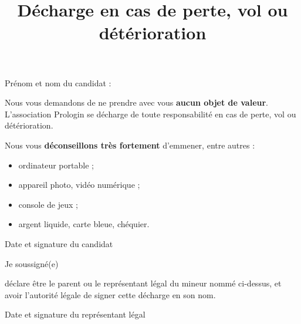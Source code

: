 \documentclass[a4paper,11pt]{prologin}
\title{Décharge en cas de perte, vol ou détérioration}
\begin{document}
Prénom et nom du candidat : \hrulefill

Nous vous demandons de ne prendre avec vous \textbf{aucun objet de valeur}.
L'association Prologin se décharge de toute responsabilité en cas de perte,
vol ou détérioration.

Nous vous \textbf{déconseillons très fortement} d'emmener, entre autres :
\begin{itemize}
\item ordinateur portable ;
\item appareil photo, vidéo numérique ;
\item console de jeux ;
\item argent liquide, carte bleue, chéquier.
\end{itemize}\vspace{2mm}

\begin{signatureframe}{Date et signature du candidat}\end{signatureframe}

\begin{legalrepframe}[title=À remplir par le représentant légal si le candidat est mineur]
Je soussigné(e) \hrulefill

déclare être le parent ou le représentant légal du mineur nommé
ci-dessus, et avoir l'autorité légale de signer cette décharge en son nom.

\begin{signatureframe}{Date et signature du représentant légal}\end{signatureframe}


\end{legalrepframe}
\end{document}
